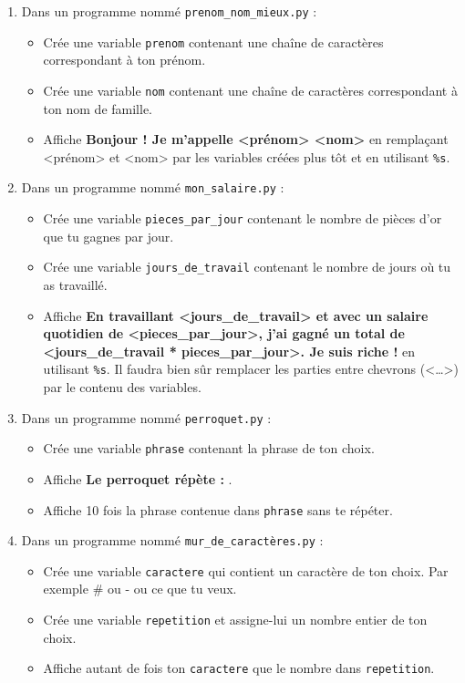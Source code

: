 \documentclass[11pt]{article}
\begin{document}
\begin{enumerate}
\item Dans un programme nommé \texttt{prenom\_nom\_mieux.py} :
\begin{itemize}
\item Crée une variable \texttt{prenom} contenant une chaîne de caractères correspondant à ton prénom.
\item Crée une variable \texttt{nom} contenant une chaîne de caractères correspondant à ton nom de famille.
\item Affiche \textbf{\og Bonjour ! Je m'appelle <prénom> <nom>\fg{}} en remplaçant <prénom> et <nom> par les variables créées plus tôt et en utilisant \texttt{\%s}.
\end{itemize}

\item Dans un programme nommé \texttt{mon\_salaire.py} :
\begin{itemize}
\item Crée une variable \texttt{pieces\_par\_jour} contenant le nombre de pièces d'or que tu gagnes par jour.
\item Crée une variable \texttt{jours\_de\_travail} contenant le nombre de jours où tu as travaillé.
\item Affiche \textbf{\og En travaillant <jours\_de\_travail> et avec un salaire quotidien de <pieces\_par\_jour>, j'ai gagné un total de <jours\_de\_travail * pieces\_par\_jour>. Je suis riche !\fg{}} en utilisant \texttt{\%s}. Il faudra bien sûr remplacer les parties entre chevrons (<\ldots{}>) par le contenu des variables.
\end{itemize}

\item Dans un programme nommé \texttt{perroquet.py} :
\begin{itemize}
\item Crée une variable \texttt{phrase} contenant la phrase de ton choix.
\item Affiche \textbf{\og Le perroquet répète : \fg{}}.
\item Affiche 10 fois la phrase contenue dans \texttt{phrase} sans te répéter.
\end{itemize}

\item Dans un programme nommé \texttt{mur\_de\_caractères.py} :
\begin{itemize}
\item Crée une variable \texttt{caractere} qui contient un caractère de ton choix. Par exemple \og \#\fg{} ou \og -\fg{} ou ce que tu veux.
\item Crée une variable \texttt{repetition} et assigne-lui un nombre entier de ton choix.
\item Affiche autant de fois ton \texttt{caractere} que le nombre dans \texttt{repetition}.
\end{itemize}
\end{enumerate}
\end{document}
